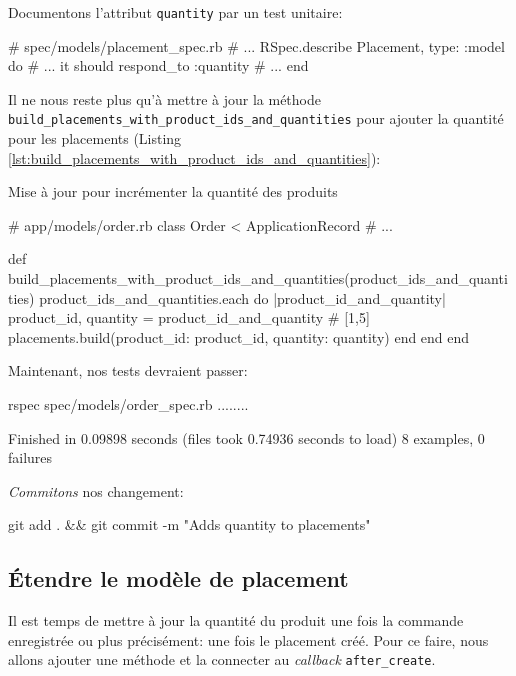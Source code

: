 \documentclass[]{report}
\begin{document}
    Documentons l'attribut \verb|quantity| par un test unitaire:

    \begin{rubycode}
    # spec/models/placement_spec.rb
    # ...
    RSpec.describe Placement, type: :model do
      # ...
      it { should respond_to :quantity }
      # ...
    end
    \end{rubycode}

    Il ne nous reste plus qu'à mettre à jour la méthode \verb|build_placements_with_product_ids_and_quantities| pour ajouter la quantité pour les placements (Listing \ref{lst:build_placements_with_product_ids_and_quantities}):

    \begin{listing}
      \label{lst:build_placements_with_product_ids_and_quantities}
      \caption{Mise à jour pour incrémenter la quantité des produits}
      \begin{rubycode}
      # app/models/order.rb
      class Order < ApplicationRecord
        # ...

        def build_placements_with_product_ids_and_quantities(product_ids_and_quantities)
          product_ids_and_quantities.each do |product_id_and_quantity|
            product_id, quantity = product_id_and_quantity # [1,5]
            placements.build(product_id: product_id, quantity: quantity)
          end
        end
      end
      \end{rubycode}
    \end{listing}

    Maintenant, nos tests devraient passer:

    \begin{bashcode}
    rspec spec/models/order_spec.rb
    ........

    Finished in 0.09898 seconds (files took 0.74936 seconds to load)
    8 examples, 0 failures
    \end{bashcode}

    \textit{Commitons} nos changement:

    \begin{bashcode}
    git add . && git commit -m "Adds quantity to placements"
    \end{bashcode}

    \subsection{Étendre le modèle de placement}

    Il est temps de mettre à jour la quantité du produit une fois la commande enregistrée ou plus précisément: une fois le placement créé. Pour ce faire, nous allons ajouter une méthode et la connecter au \textit{callback} \verb|after_create|.
\end{document}
